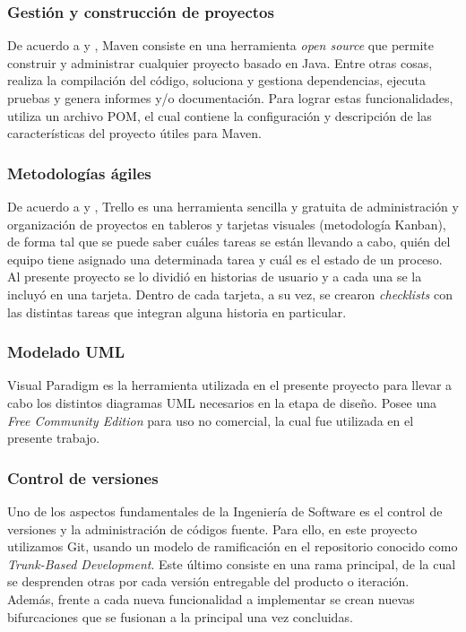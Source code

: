 \subsubsection *{Gestión y construcción de proyectos}

De acuerdo a \parencite{apache_maven} y \parencite{java_maven}, Maven
consiste en una herramienta \textit{open source} que permite construir y
administrar cualquier proyecto basado en Java. Entre otras cosas, realiza la
compilación del código, soluciona y gestiona dependencias, ejecuta pruebas y
genera informes y/o documentación. Para lograr estas funcionalidades, utiliza un
archivo POM, el cual contiene la configuración y descripción de las
características del proyecto útiles para Maven.

\subsubsection *{Metodologías ágiles}

De acuerdo a \parencite{trello} y
\parencite{prod_trello}, Trello es una herramienta sencilla y gratuita de
administración y organización de proyectos en tableros y tarjetas visuales
(metodología Kanban), de forma tal que se puede saber cuáles tareas se están
llevando a cabo, quién del equipo tiene asignado una determinada tarea y cuál es
el estado de un proceso. Al presente proyecto se lo dividió en historias de
usuario y a cada una se la incluyó en una tarjeta. Dentro de cada tarjeta, a su
vez, se crearon \textit{checklists} con las distintas tareas que integran alguna
historia en particular.


\subsubsection *{Modelado UML}

Visual Paradigm es la herramienta utilizada en el presente proyecto para llevar a cabo los
distintos diagramas UML necesarios en la etapa de diseño. Posee una \textit{Free
  Community Edition} para uso no comercial, la cual fue utilizada en el presente
trabajo.


\subsubsection *{Control de versiones}

Uno de los aspectos fundamentales de la Ingeniería de Software es el control de versiones y la administración de códigos fuente. Para ello, en este proyecto utilizamos Git, usando un modelo de ramificación en el repositorio conocido como \textit{Trunk-Based Development}. Este último consiste en una rama principal, de la cual se desprenden otras por cada versión entregable del producto o iteración. Además, frente a cada nueva funcionalidad a implementar se crean nuevas bifurcaciones que se fusionan a la principal una vez concluidas.

